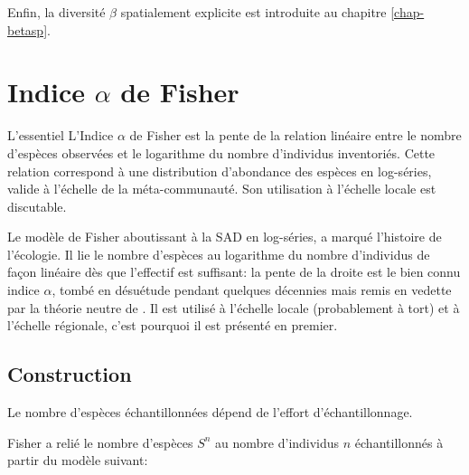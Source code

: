 \documentclass[
  11pt,
  french,
  a4paper,
  extrafontsizes,onecolumn,openright
  ]{memoir}
\newenvironment{Summary}
  {\begin{bclogo}[logo=\bctrombone, noborder=true, couleur=lightgray!50]{L'essentiel}\parindent0pt}
  {\end{bclogo}}
\begin{document}
Enfin, la diversité \(\beta\) spatialement explicite est introduite au chapitre \ref{chap-betasp}.

\chapter{\texorpdfstring{Indice \(\alpha\) de Fisher}{Indice \textbackslash alpha de Fisher}}\label{chap-Fisher}

\begin{Summary}
L'Indice \(\alpha\) de Fisher est la pente de la relation linéaire entre le nombre d'espèces observées et le logarithme du nombre d'individus inventoriés.
Cette relation correspond à une distribution d'abondance des espèces en log-séries, valide à l'échelle de la méta-communauté.
Son utilisation à l'échelle locale est discutable.

\end{Summary}

Le modèle de Fisher \autocite{Fisher1943} aboutissant à la SAD en log-séries, a marqué l'histoire de l'écologie.
Il lie le nombre d'espèces au logarithme du nombre d'individus de façon linéaire dès que l'effectif est suffisant: la pente de la droite est le bien connu indice \(\alpha\), tombé en désuétude pendant quelques décennies mais remis en vedette par la théorie neutre de \textcite{Hubbell2001}.
Il est utilisé à l'échelle locale (probablement à tort) et à l'échelle régionale, c'est pourquoi il est présenté en premier.

\section{Construction}\label{construction}

Le nombre d'espèces échantillonnées dépend de l'effort d'échantillonnage.

Fisher a relié le nombre d'espèces \(S^{n}\) au nombre d'individus \(n\) échantillonnés à partir du modèle suivant:
\end{document}
